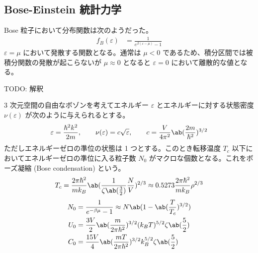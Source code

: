 \documentclass[a4paper,11pt]{jlreq}
\begin{document}
\subsection{Bose-Einstein 統計力学}
Bose 粒子において分布関数は次のようだった。
\begin{align}
  f_B(\varepsilon) & = \frac{1}{e^{\beta(\varepsilon - \mu)} - 1}
\end{align}
$\varepsilon = \mu$ において発散する関数となる。通常は $\mu < 0$ であるため、積分区間では被積分関数の発散が起こらないが $\mu \approx 0$ となると $\varepsilon = 0$ において離散的な値となる。

TODO: 解釈

\begin{theorem}
  3 次元空間の自由なボゾンを考えてエネルギー $\varepsilon$ とエネルギーに対する状態密度 $\nu(\varepsilon)$ が次のように与えられるとする。
  \begin{align}
    \varepsilon = \frac{\hbar^2k^2}{2m}, \qquad \nu(\varepsilon) = c\sqrt{\varepsilon}, \qquad c = \frac{V}{4\pi^2}\ab(\frac{2m}{\hbar^2})^{3/2}
  \end{align}
  ただしエネルギーゼロの準位の状態は 1 つとする。このとき転移温度 $T_c$ 以下においてエネルギーゼロの準位に入る粒子数 $N_0$ がマクロな個数となる。これをボーズ凝縮 (Bose condensation) という。
  \begin{align}
    T_c = \frac{2\pi\hbar^2}{mk_B}\ab(\frac{1}{\zeta\ab(\frac{3}{2})}\frac{N}{V})^{2/3} \approx 0.5273\frac{2\pi\hbar^2}{mk_B}\rho^{2/3}
  \end{align}
  \begin{align}
    N_0 & = \frac{1}{e^{-\beta\mu} - 1} \approx N\ab(1 - \ab(\frac{T}{T_c})^{3/2})        \\
    U_0 & = \frac{3V}{2}\ab(\frac{m}{2\pi\hbar^2})^{3/2}(k_BT)^{5/2}\zeta\ab(\frac{5}{2}) \\
    C_0 & = \frac{15V}{4}\ab(\frac{mT}{2\pi\hbar^2})^{3/2}k_B^{5/2}\zeta\ab(\frac{5}{2})
  \end{align}
\end{theorem}
\end{document}

